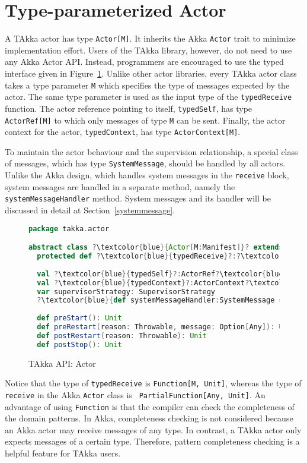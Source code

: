 \section{Type-parameterized Actor}
\label{takka_actor}
A TAkka actor has type {\tt Actor[M]}.  It inherits the Akka {\tt Actor} 
trait to minimize implementation effort.  Users of the TAkka library, 
however, do not need to use any Akka Actor API.  Instead, programmers are 
encouraged to use the typed interface given in Figure~\ref{takka_actor_api}.  
Unlike other actor libraries, every TAkka actor class takes a type parameter 
{\tt M} which specifies the type of messages expected by the actor.  The same 
type parameter is used as the input type of the {\tt typedReceive} function.  
The actor reference pointing to itself, {\tt typedSelf}, has type {\tt 
ActorRef[M]} to which only messages of type {\tt M} can be sent.  
Finally, the actor context for the actor, {\tt typedContext}, has type {\tt ActorContext[M]}.  

To maintain the actor behaviour and the supervision relationship, a special class
of messages, which has type {\tt SystemMessage}, should be handled by all actors.
Unlike the Akka design, which handles system messages in the {\tt receive} block,
system messages are handled in a separate method, namely the {\tt systemMessageHandler} method.
System messages and its handler will be discussed in detail at Section~\ref{systemmessage}.


\begin{figure}[h]
\begin{lstlisting}[language=scala, escapechar=?]
package takka.actor

abstract class ?\textcolor{blue}{Actor[M:Manifest]}? extends akka.actor.Actor
  protected def ?\textcolor{blue}{typedReceive}?:?\textcolor{blue}{Function}?[?\textcolor{blue}{M}?, Unit]
  
  val ?\textcolor{blue}{typedSelf}?:ActorRef?\textcolor{blue}{[M]}?
  val ?\textcolor{blue}{typedContext}?:ActorContext?\textcolor{blue}{[M]}?
  var supervisorStrategy: SupervisorStrategy
  ?\textcolor{blue}{def systemMessageHandler:SystemMessage => Unit}?
  
  def preStart(): Unit
  def preRestart(reason: Throwable, message: Option[Any]): Unit
  def postRestart(reason: Throwable): Unit
  def postStop(): Unit
\end{lstlisting}
\caption{TAkka API: Actor}
\label{takka_actor_api}
\end{figure}

Notice that the type of {\tt typedReceive} is {\tt Function[M, Unit]}, whereas 
the type of {\tt receive} in the Akka {\tt Actor} class is {\tt 
PartialFunction[Any, Unit]}.  An 
advantage of using {\tt Function} is that the compiler can check the 
completeness of the domain patterns.  In Akka, completeness checking is not considered
because an Akka actor may receive messages of any type.  In contrast, a TAkka 
actor only expects messages of a certain type.  Therefore, pattern completeness 
checking is a helpful feature for TAkka users.

